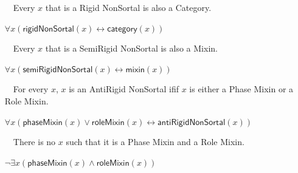 \documentclass{article}
\newcommand{\AxLabel}{a}
\newcounter{cntax}
\newcommand{\myax}[1]{\refstepcounter{cntax}{\bf \small \AxLabel\thecntax}\label{#1}$\,\,\,\,$}
\newcommand{\me}[1]{\textsf{#1}}
\begin{document}
\begin{itemize}
    

    \item[\myax{ax_rigidNonSortal_taxonomy}] Every $x$ that is a \me{Rigid NonSortal} is also a \me{Category}.
    
    $\forall x(\textsf{rigidNonSortal}(x)\leftrightarrow \textsf{category}(x))$
    
    

    \item[\myax{ax_semiRigidNonSortal_taxonomy}] Every $x$ that is a \me{SemiRigid NonSortal} is also a \me{Mixin}.
    
    $\forall x(\textsf{semiRigidNonSortal}(x)\leftrightarrow \textsf{mixin}(x))$
    
    

    \item[\myax{ax_antiRigidNonSortal_taxonomy}] For every $x$, $x$ is an \me{AntiRigid NonSortal} ifif $x$ is either a \me{Phase Mixin} or a \me{Role Mixin}.
    
    $\forall x(\textsf{phaseMixin}(x)\vee \textsf{roleMixin}(x)\leftrightarrow \textsf{antiRigidNonSortal}(x))$
    
    
    
    \item[\myax{ax_antiRigidNonSortal_partition}] There is no $x$ such that it is a \me{Phase Mixin} and a \me{Role Mixin}.
    
    $\neg \exists x(\textsf{phaseMixin}(x)\wedge \textsf{roleMixin}(x))$
    
    
\end{itemize}






\end{document}
